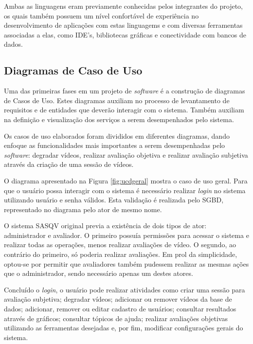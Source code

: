 Ambas as linguagens eram previamente conhecidas pelos integrantes do projeto, os quais também possuem um nível confortável de experiência no desenvolvimento de aplicações com estas linguagems e com diversas ferramentas associadas a elas, como IDE's, bibliotecas gráficas e conectividade com bancos de dados.

\subsection{Diagramas de Caso de Uso}

Uma das primeiras fases em um projeto de \emph{software} é a construção de diagramas de Casos de Uso. Estes diagramas auxiliam no processo de levantamento de requisitos e de entidades que deverão interagir com o sistema. Também auxiliam na definição e visualização dos serviços a serem desempenhados pelo sistema.

Os casos de uso elaborados foram divididos em diferentes diagramas, dando enfoque as funcionalidades mais importantes a serem desempenhadas pelo \emph{software}: degradar vídeos, realizar avaliação objetiva e realizar avaliação subjetiva através da criação de uma sessão de vídeos.

O diagrama apresentado na Figura \ref{fig:ucdgeral} mostra o caso de uso geral. Para que o usuário possa interagir com o sistema é necessário realizar \emph{login} no sistema utilizando usuário e senha válidos. Esta validação é realizada pelo SGBD, representado no diagrama pelo ator de mesmo nome.

O sistema SASQV original previa a existência de dois tipos de ator: administrador e avaliador. O primeiro possuía permissões para acessar o sistema e realizar todas as operações, menos realizar avaliações de vídeo. O segundo, ao contrário do primeiro, só poderia realizar avaliações. Em prol da simplicidade, optou-se por permitir que avaliadores também pudessem realizar as mesmas ações que o administrador, sendo necessário apenas um destes atores.

Concluído o \emph{login}, o usuário pode realizar atividades como criar uma sessão para avaliação subjetiva; degradar vídeos; adicionar ou remover vídeos da base de dados; adicionar, remover ou editar cadastro de usuários; consultar resultados através de gráficos; consultar tópicos de ajuda; realizar avaliações objetivas utilizando as ferramentas desejadas e, por fim, modificar configurações gerais do sistema.

